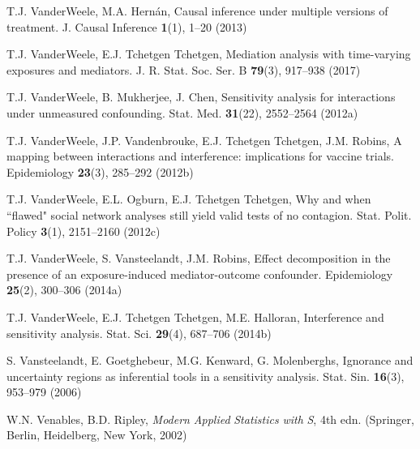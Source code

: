 \begin{list}{}{\setlength{\leftmargin}{2.1em}\setlength{\labelwidth}{0pt}
  \setlength{\labelsep}{0pt}\setlength{\itemindent}{-2.1em}
  \setlength{\parsep}{0pt}\setlength{\itemsep}{2pt}\setlength{\topsep}{0pt}}
\item\label{refentry:REF452}T.J. VanderWeele, M.A. Hernán, Causal inference under multiple versions of treatment. J. Causal Inference \textbf{1}(1), 1--20 (2013)\label{refend:REF452}
\item\label{refentry:REF453}T.J. VanderWeele, E.J. Tchetgen Tchetgen, Mediation analysis with time-varying exposures and mediators. J. R. Stat. Soc. Ser. B \textbf{79}(3), 917--938 (2017)\label{refend:REF453}
\item\label{refentry:REF454}T.J. VanderWeele, B. Mukherjee, J. Chen, Sensitivity analysis for interactions under unmeasured confounding. Stat. Med. \textbf{31}(22), 2552--2564 (2012a)\label{refend:REF454}
\item\label{refentry:REF455}T.J. VanderWeele, J.P. Vandenbrouke, E.J. Tchetgen Tchetgen, J.M. Robins, A mapping between interactions and interference: implications for vaccine trials. Epidemiology \textbf{23}(3), 285--292 (2012b)\label{refend:REF455}
\item\label{refentry:REF456}T.J. VanderWeele, E.L. Ogburn, E.J. Tchetgen Tchetgen, Why and when ``flawed" social network analyses still yield valid tests of no contagion. Stat. Polit. Policy \textbf{3}(1), 2151--2160 (2012c)\label{refend:REF456}
\item\label{refentry:REF457}T.J. VanderWeele, S. Vansteelandt, J.M. Robins, Effect decomposition in the presence of an exposure-induced mediator-outcome confounder. Epidemiology \textbf{25}(2), 300--306 (2014a)\label{refend:REF457}
\item\label{refentry:REF458}T.J. VanderWeele, E.J. Tchetgen Tchetgen, M.E. Halloran, Interference and sensitivity analysis. Stat. Sci. \textbf{29}(4), 687--706 (2014b)\label{refend:REF458}
\item\label{refentry:REF459}S. Vansteelandt, E. Goetghebeur, M.G. Kenward, G. Molenberghs, Ignorance and uncertainty regions as inferential tools in a sensitivity analysis. Stat. Sin. \textbf{16}(3), 953--979 (2006)\label{refend:REF459}
\item\label{refentry:REF460}W.N. Venables, B.D. Ripley, \textit{Modern} \textit{Applied} \textit{Statistics} \textit{with} \textit{S}, 4th edn. (Springer, Berlin, Heidelberg, New York, 2002)\label{refend:REF460}

\end{list}
